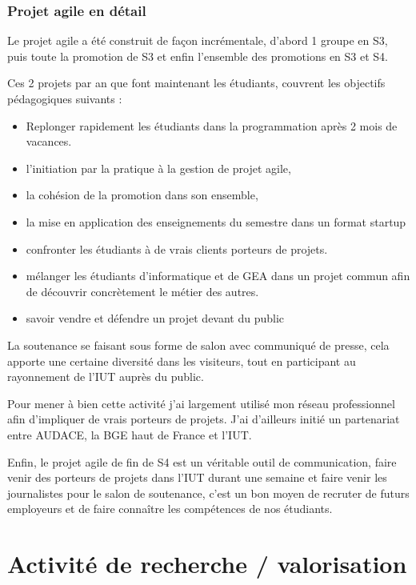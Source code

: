 \documentclass[a4paper]{article}
\begin{document}
\subsubsection{Projet agile en détail}

Le projet agile a été construit de façon incrémentale, d'abord 1 groupe en S3, puis toute la promotion de S3 et enfin l'ensemble des promotions en S3 et S4.

Ces 2 projets par an que font maintenant les étudiants, couvrent les objectifs pédagogiques suivants : 
\begin{itemize}
\item Replonger rapidement les étudiants dans la programmation après 2 mois de vacances.
\item l'initiation par la pratique à la gestion de projet agile, 
\item la cohésion de la promotion dans son ensemble,
\item la mise en application des enseignements du semestre dans un format startup
\item confronter les étudiants à de vrais clients porteurs de projets.
\item mélanger les étudiants d'informatique et de GEA dans un projet commun afin de découvrir concrètement le métier des autres.
\item savoir vendre et défendre un projet devant du public 
\end{itemize}

La soutenance se faisant sous forme de salon avec communiqué de presse, cela apporte une certaine diversité dans les visiteurs, tout en participant au rayonnement de l'IUT auprès du public.

Pour mener à bien cette activité j'ai largement utilisé mon réseau professionnel afin d'impliquer de vrais porteurs de projets. 
J'ai d'ailleurs initié un partenariat entre AUDACE, la BGE haut de France et l'IUT.

Enfin, le projet agile de fin de S4 est un véritable outil de communication, faire venir des porteurs de projets dans l'IUT durant une semaine et faire venir les journalistes pour le salon de soutenance, c'est un bon moyen de recruter de futurs employeurs et de faire connaître les compétences de nos étudiants.

\section{Activité de recherche / valorisation}
\end{document}

